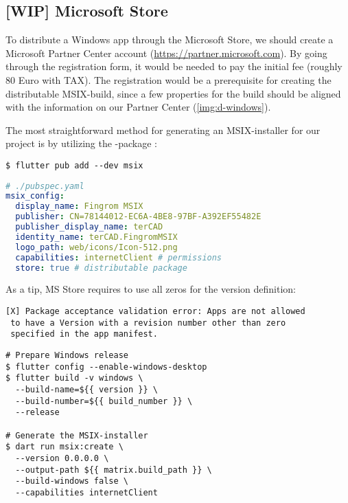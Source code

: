 
\subsection{[WIP] Microsoft Store}

To distribute a Windows app through the Microsoft Store, we should create a Microsoft Partner Center account
(\href{https://partner.microsoft.com}{https://partner.microsoft.com}). By going through the registration form, it 
would be needed to pay the initial fee (roughly 80 Euro with TAX). The registration would be a prerequisite for 
creating the distributable MSIX-build, since a few properties for the build should be aligned with the information on 
our Partner Center (\cref{img:d-windows}). 

The most straightforward method for generating an MSIX-installer for our project is by utilizing the 
-package :

\begin{lstlisting}[language=terminal]
$ flutter pub add --dev msix
\end{lstlisting}

\begin{lstlisting}[language=yaml]
# ./pubspec.yaml
msix_config:
  display_name: Fingrom MSIX
  publisher: CN=78144012-EC6A-4BE8-97BF-A392EF55482E
  publisher_display_name: terCAD
  identity_name: terCAD.FingromMSIX
  logo_path: web/icons/Icon-512.png
  capabilities: internetClient # permissions
  store: true # distributable package
\end{lstlisting}


\noindent As a tip, MS Store requires to use all zeros for the version definition:

\begin{lstlisting}[language=terminal]
[X] Package acceptance validation error: Apps are not allowed
 to have a Version with a revision number other than zero 
 specified in the app manifest.
\end{lstlisting}

\begin{lstlisting}[language=terminal]
# Prepare Windows release
$ flutter config --enable-windows-desktop
$ flutter build -v windows \
  --build-name=${{ version }} \
  --build-number=${{ build_number }} \
  --release

# Generate the MSIX-installer
$ dart run msix:create \
  --version 0.0.0.0	\
  --output-path ${{ matrix.build_path }} \
  --build-windows false \
  --capabilities internetClient
\end{lstlisting}

